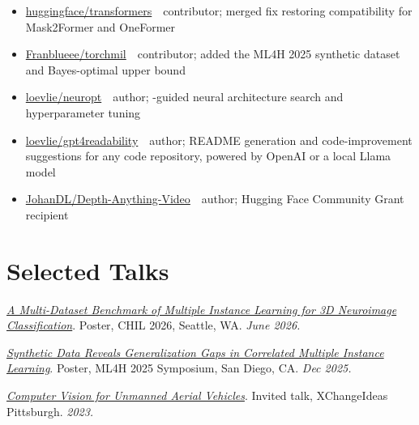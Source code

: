 \documentclass[10pt,letterpaper]{article}
\newcommand{\monofam}{\ttfamily}
\newcommand{\acro}[1]{\textls[80]{#1}}
\newenvironment{publist}{%
  \begin{list}{}{%
    \setlength{\leftmargin}{1.2em}%
    \setlength{\itemindent}{-1.2em}%
    \setlength{\itemsep}{2pt}%
    \setlength{\parsep}{0pt}%
    \setlength{\topsep}{1pt}%
  }%
}{\end{list}}
\begin{document}
\begin{itemize}
  \item \href{https://github.com/huggingface/transformers}{\monofam huggingface/transformers} \,\textemdash\, contributor; merged fix restoring \monofam{torch.compile} compatibility for Mask2Former and OneFormer
  \item \href{https://github.com/Franblueee/torchmil}{\monofam Franblueee/torchmil} \,\textemdash\, contributor; added the ML4H 2025 synthetic dataset and Bayes-optimal upper bound
  \item \href{https://github.com/loevlie/neuropt}{\monofam loevlie/neuropt} \,\textemdash\, author; \acro{LLM}-guided neural architecture search and hyperparameter tuning
  \item \href{https://github.com/loevlie/gpt4readability}{\monofam loevlie/gpt4readability} \,\textemdash\, author; README generation and code-improvement suggestions for any code repository, powered by OpenAI or a local Llama model
  \item \href{https://huggingface.co/spaces/JohanDL/Depth-Anything-Video}{\monofam JohanDL/Depth-Anything-Video} \,\textemdash\, author; Hugging Face Community Grant recipient
\end{itemize}

\section{Selected Talks}

\begin{publist}
\item \href{https://drive.google.com/file/d/18nFiw33ZuQlHw3z-uM-b8ROkWn8_ZpR2/view?usp=sharing}{\textit{A Multi-Dataset Benchmark of Multiple Instance Learning for 3D Neuroimage Classification}}. Poster, CHIL 2026, Seattle, WA. \textit{June 2026.}

\item \href{https://drive.google.com/file/d/1Z6lkTsqYSIzOqgM53qONW2riQhVM5R0W/view?usp=sharing}{\textit{Synthetic Data Reveals Generalization Gaps in Correlated Multiple Instance Learning}}. Poster, ML4H 2025 Symposium, San Diego, CA. \textit{Dec 2025.}

\item \href{https://xchangepgh2023.sched.com/event/1LdC7/an-interactive-exploration-of-computer-vision-for-unmanned-aerial-vehicles-uavs}{\textit{Computer Vision for Unmanned Aerial Vehicles}}. Invited talk, XChangeIdeas Pittsburgh. \textit{2023.}
\end{publist}
\end{document}
